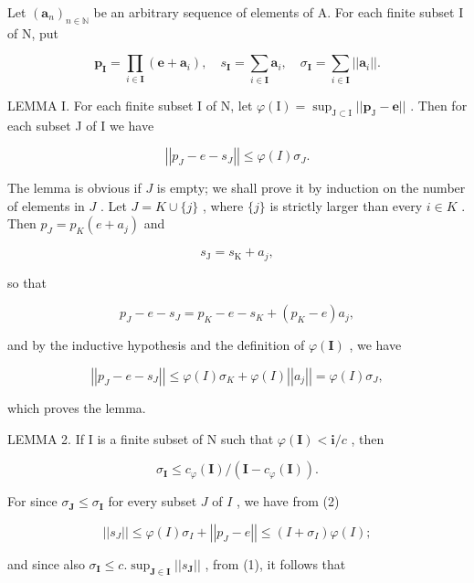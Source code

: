 Let \((\pmb{a}_n)_{n\in \mathbb{N}}\) be an arbitrary sequence of elements of A. For each finite subset I of N, put

\[
\boldsymbol {p} _ {\mathbf {I}} = \prod_ {i \in \mathbf {I}} (\boldsymbol {e} + \boldsymbol {a} _ {i}), \quad s _ {\mathbf {I}} = \sum_ {i \in \mathbf {I}} \boldsymbol {a} _ {i}, \quad \sigma_ {\mathbf {I}} = \sum_ {i \in \mathbf {I}} | | \boldsymbol {a} _ {i} | |.
\]

LEMMA I. For each finite subset I of N, let \(\varphi(\mathrm{I}) = \sup_{\mathrm{J} \subset \mathrm{I}} ||\boldsymbol{p}_{\mathrm{J}} - \boldsymbol{e}||\) . Then for each subset J of I we have

\[
\left| \left| p _ {J} - e - s _ {J} \right| \right| \leqslant \varphi (I) \sigma_ {J}.\tag{2}
\]

The lemma is obvious if \(J\) is empty; we shall prove it by induction on the number of elements in \(J\) . Let \(J = K \cup \{j\}\) , where \(\{j\}\) is strictly larger than every \(i \in K\) . Then \(p_J = p_K(e + a_j)\) and

\[
s _ {\mathrm{J}} = s _ {\mathrm{K}} + a _ {j},
\]

so that

\[
p _ {J} - e - s _ {J} = p _ {K} - e - s _ {K} + (p _ {K} - e) a _ {j},
\]

and by the inductive hypothesis and the definition of \(\varphi(\mathbf{I})\) , we have

\[
\left| \left| p _ {J} - e - s _ {J} \right| \right| \leqslant \varphi (I) \sigma_ {K} + \varphi (I) \left| \left| a _ {j} \right| \right| = \varphi (I) \sigma_ {J},
\]

which proves the lemma.

LEMMA 2. If I is a finite subset of N such that \(\varphi(\mathbf{I}) < \mathbf{i}/c\) , then

\[
\sigma_ {\mathbf {I}} \leqslant c _ {\varphi} (\mathbf {I}) / (\mathbf {I} - c _ {\varphi} (\mathbf {I})).
\]

For since \(\sigma_{\mathbf{J}} \leqslant \sigma_{\mathbf{I}}\) for every subset \(J\) of \(I\) , we have from (2)

\[
\left| \left| s _ {J} \right| \right| \leqslant \varphi (I) \sigma_ {I} + \left| \left| p _ {J} - e \right| \right| \leqslant (I + \sigma_ {I}) \varphi (I);
\]

and since also \(\sigma_{\mathbf{I}} \leqslant c.\sup_{\mathbf{J} \in \mathbf{I}} ||s_{\mathbf{J}}||\) , from (1), it follows that

